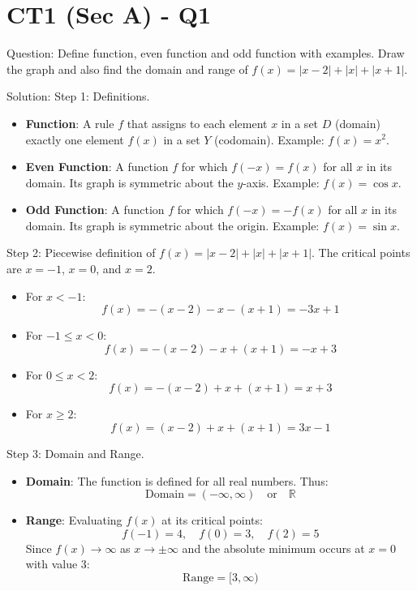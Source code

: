 \documentclass{article}
\begin{document}
\section*{CT1 (Sec A) - Q1}
Question:
Define function, even function and odd function with examples. Draw the graph and also find the domain and range of $f(x) = |x-2| + |x| + |x+1|$.

Solution:
Step 1: Definitions.
\begin{itemize}
    \item \textbf{Function}: A rule $f$ that assigns to each element $x$ in a set $D$ (domain) exactly one element $f(x)$ in a set $Y$ (codomain). Example: $f(x) = x^2$.
    \item \textbf{Even Function}: A function $f$ for which $f(-x) = f(x)$ for all $x$ in its domain. Its graph is symmetric about the $y$-axis. Example: $f(x) = \cos x$.
    \item \textbf{Odd Function}: A function $f$ for which $f(-x) = -f(x)$ for all $x$ in its domain. Its graph is symmetric about the origin. Example: $f(x) = \sin x$.
\end{itemize}

Step 2: Piecewise definition of $f(x) = |x-2| + |x| + |x+1|$.
The critical points are $x = -1$, $x = 0$, and $x = 2$.
\begin{itemize}
    \item For $x < -1$:
    \[
    f(x) = -(x-2) - x - (x+1) = -3x + 1
    \]
    \item For $-1 \le x < 0$:
    \[
    f(x) = -(x-2) - x + (x+1) = -x + 3
    \]
    \item For $0 \le x < 2$:
    \[
    f(x) = -(x-2) + x + (x+1) = x + 3
    \]
    \item For $x \ge 2$:
    \[
    f(x) = (x-2) + x + (x+1) = 3x - 1
    \]
\end{itemize}

Step 3: Domain and Range.
\begin{itemize}
    \item \textbf{Domain}: The function is defined for all real numbers. Thus:
    \[
    \text{Domain} = (-\infty, \infty) \quad \text{or} \quad \mathbb{R}
    \]
    \item \textbf{Range}: Evaluating $f(x)$ at its critical points:
    \[
    f(-1) = 4, \quad f(0) = 3, \quad f(2) = 5
    \]
    Since $f(x) \to \infty$ as $x \to \pm\infty$ and the absolute minimum occurs at $x = 0$ with value $3$:
    \[
    \text{Range} = [3, \infty)
    \]
\end{itemize}
\end{document}
